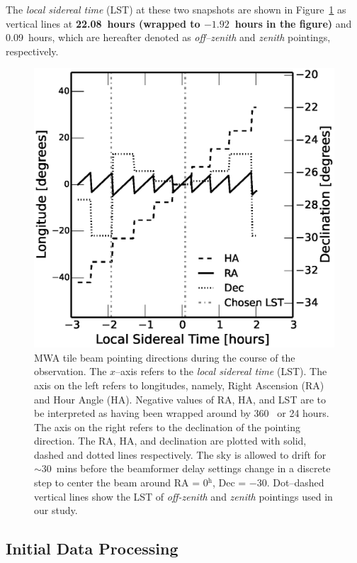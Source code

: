 \documentclass[preprint2,iop,numberedappendix]{emulateapj}
\begin{document}
The {\it local sidereal time} (LST) at these two snapshots are shown in Figure~\ref{fig:pointings} as vertical lines at {\bf 22.08~hours (wrapped to $-1.92$~hours in the figure)} and 0.09~hours, which are hereafter denoted as {\it off--zenith} and {\it zenith} pointings, respectively. 

\begin{figure}[htb]
\centering
\includegraphics[width=\linewidth]{fig3.eps}
\caption{MWA tile beam pointing directions during the course of the observation. The $x$--axis refers to the {\it local sidereal time} (LST). The axis on the left refers to longitudes, namely, Right Ascension (RA) and Hour Angle (HA). Negative values of RA, HA, and LST are to be interpreted as having been wrapped around by 360\arcdeg~ or 24 hours. The axis on the right refers to the declination of the pointing direction. The RA, HA, and declination are plotted with solid, dashed and dotted lines respectively. The sky is allowed to drift for $\sim 30$~mins before the beamformer delay settings change in a discrete step to center the beam around RA = 0$^\textrm{h}$, Dec = $-30$\arcdeg. Dot--dashed vertical lines show the LST of {\it off-zenith} and {\it zenith} pointings used in our study. \label{fig:pointings}}
\end{figure}

\subsection{Initial Data Processing}\label{sec:data-analysis}
\end{document}
